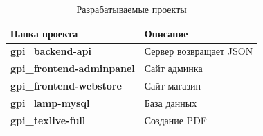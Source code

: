 \begin{table}[!h]
    \centering
    \caption{Разрабатываемые проекты}
    \begin{tabular}{|l|l|}
        \hline
        \textbf{Папка проекта}              & \textbf{Описание}         \\ \hline
        \textbf{gpi\_backend-api}           & Сервер возвращает JSON    \\ \hline 
        \textbf{gpi\_frontend-adminpanel}   & Сайт админка              \\ \hline  
        \textbf{gpi\_frontend-webstore}     & Сайт магазин              \\ \hline
        \textbf{gpi\_lamp-mysql}            & База данных               \\ \hline
        \textbf{gpi\_texlive-full}          & Создание PDF              \\ \hline
    \end{tabular}
\end{table}

\newpage

